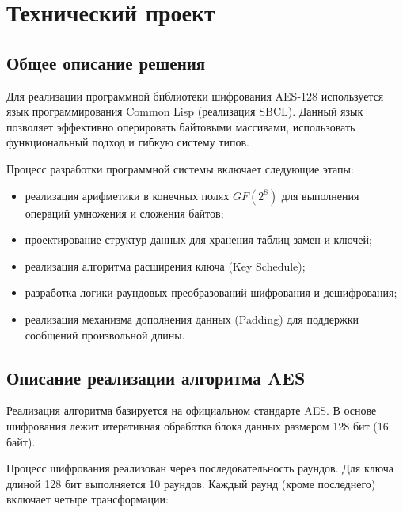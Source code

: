 \section{Технический проект}

\subsection{Общее описание решения}

Для реализации программной библиотеки шифрования AES-128 используется язык программирования Common Lisp (реализация SBCL). Данный язык позволяет эффективно оперировать байтовыми массивами, использовать функциональный подход и гибкую систему типов.

Процесс разработки программной системы включает следующие этапы:
\begin{itemize}
	\item реализация арифметики в конечных полях $GF(2^8)$ для выполнения операций умножения и сложения байтов;
	\item проектирование структур данных для хранения таблиц замен и ключей;
	\item реализация алгоритма расширения ключа (Key Schedule);
	\item разработка логики раундовых преобразований шифрования и дешифрования;
	\item реализация механизма дополнения данных (Padding) для поддержки сообщений произвольной длины.
\end{itemize}

\subsection{Описание реализации алгоритма AES}

Реализация алгоритма базируется на официальном стандарте AES. В основе шифрования лежит итеративная обработка блока данных размером 128 бит (16 байт).

Процесс шифрования реализован через последовательность раундов. Для ключа длиной 128 бит выполняется 10 раундов. Каждый раунд (кроме последнего) включает четыре трансформации:

